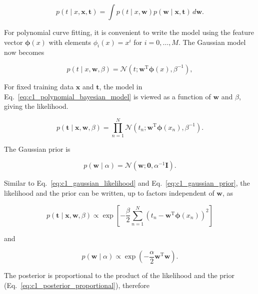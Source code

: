 \documentclass[10pt,twocolumn]{memoir}
\begin{document}
\begin{equation}
    p(t\mid x,\mathbf{x},\mathbf{t}) = \int p(t\mid x,\mathbf{w}) p(\mathbf{w}\mid\mathbf{x},\mathbf{t})\,d\mathbf{w}.
\label{eq:c1_bayesian_predictive_distribution}
\end{equation}

For polynomial curve fitting, it is convenient to write the model using the feature vector $\boldsymbol{\phi}(x)$ with elements $\phi_i(x) = x^i$ for $i=0,\dots,M$. The Gaussian model now becomes

\begin{equation}
    p(t\mid x,\mathbf{w},\beta) = \mathcal{N}\left(t;\mathbf{w}^{\mathrm{T}}\boldsymbol{\phi}(x),\beta^{-1}\right),
\label{eq:c1_polynomial_bayesian_model}
\end{equation}

For fixed training data $\mathbf{x}$ and $\mathbf{t}$, the model in Eq.~\ref{eq:c1_polynomial_bayesian_model} is viewed as a function of $\mathbf{w}$ and $\beta$, giving the likelihood.

\begin{equation}
    p(\mathbf{t}\mid\mathbf{x},\mathbf{w},\beta) = \prod_{n=1}^{N}\mathcal{N}\left(t_n;\mathbf{w}^{\mathrm{T}}\boldsymbol{\phi}(x_n),\beta^{-1}\right).
\end{equation}

The Gaussian prior is

\begin{equation}
    p(\mathbf{w}\mid\alpha) = \mathcal{N}\left(\mathbf{w};\mathbf{0},\alpha^{-1}\mathbf{I}\right).
\end{equation}

Similar to Eq.~\ref{eq:c1_gaussian_likelihood} and Eq.~\ref{eq:c1_gaussian_prior}, the likelihood and the prior can be written, up to factors independent of $\mathbf{w}$, as

\begin{equation}
    p(\mathbf{t}\mid\mathbf{x},\mathbf{w},\beta)\propto\exp\left[-\frac{\beta}{2}\sum_{n=1}^{N}\left(t_n-\mathbf{w}^{\mathrm{T}}\boldsymbol{\phi}(x_n)\right)^2\right]
\end{equation}

and

\begin{equation}
    p(\mathbf{w}\mid\alpha)\propto\exp\left(-\frac{\alpha}{2}\mathbf{w}^{\mathrm{T}}\mathbf{w}\right).
\end{equation}

The posterior is proportional to the product of the likelihood and the prior (Eq.~\ref{eq:c1_posterior_proportional}), therefore
\end{document}

